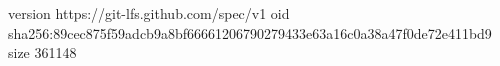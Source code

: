 version https://git-lfs.github.com/spec/v1
oid sha256:89cec875f59adcb9a8bf66661206790279433e63a16c0a38a47f0de72e411bd9
size 361148
